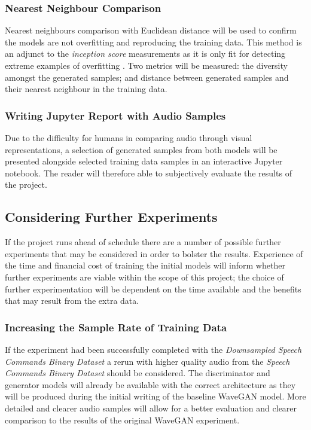 \documentclass[a4paper, dvipsnames, titlepage]{article}
\begin{document}
\subsubsection{Nearest Neighbour Comparison}

Nearest neighbours comparison with Euclidean distance will be used to confirm the models are not overfitting and reproducing the training data.
This method is an adjunct to the \textit{inception score} measurements as it is only fit for detecting extreme examples of overfitting \citep{2015arXiv151101844T}.
Two metrics will be measured: the diversity amongst the generated samples; and distance between generated samples and their nearest neighbour in the training data.

\subsubsection{Writing Jupyter Report with Audio Samples}

Due to the difficulty for humans in comparing audio through visual representations, a selection of generated samples from both models will be presented alongside selected training data samples in an interactive Jupyter notebook.
The reader will therefore able to subjectively evaluate the results of the project.

\subsection{Considering Further Experiments}

If the project runs ahead of schedule there are a number of possible further experiments that may be considered in order to bolster the results.
Experience of the time and financial cost of training the initial models will inform whether further experiments are viable within the scope of this project; the choice of further experimentation will be dependent on the time available and the benefits that may result from the extra data.

\subsubsection{Increasing the Sample Rate of Training Data}

If the experiment had been successfully completed with the \textit{Downsampled Speech Commands Binary Dataset} a rerun with higher quality audio from the \textit{Speech Commands Binary Dataset} should be considered.
The discriminator and generator models will already be available with the correct architecture as they will be produced during the initial writing of the baseline WaveGAN model.
More detailed and clearer audio samples will allow for a better evaluation and clearer comparison to the results of the original WaveGAN experiment.
\end{document}
